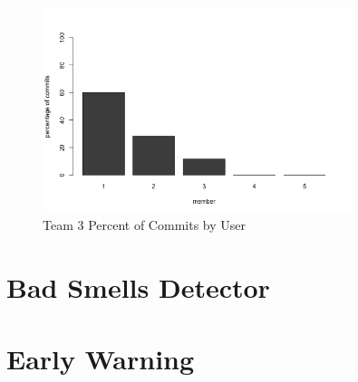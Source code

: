 \documentclass[conference]{IEEEtran}
\begin{document}
\begin{figure}[H]
    \centering
    \includegraphics[width=9cm]{../AprilProject/pic/users commit percentage team3.png}
    \caption{Team 3 Percent of Commits by User}
    \label{team3_percent_commit}
\end{figure}




\section{Bad Smells Detector}
\section{Early Warning}
\end{document}
